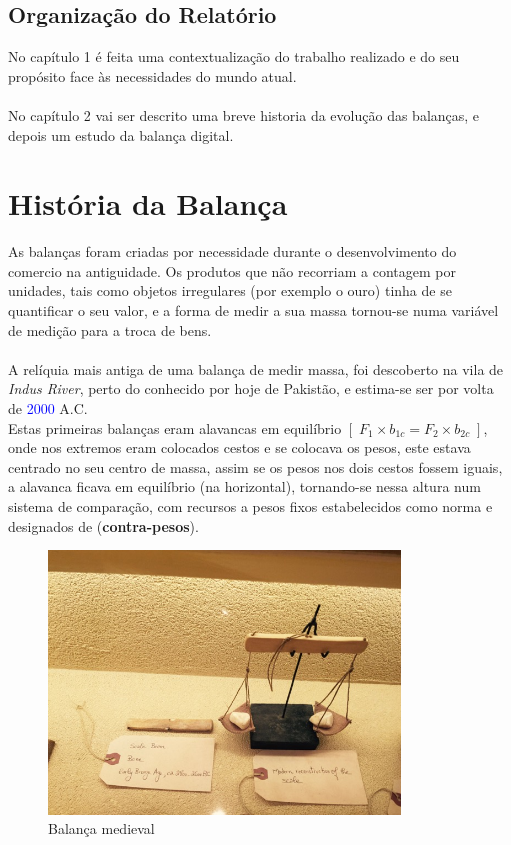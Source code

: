 \section{Organização do Relatório}
No capítulo 1 é feita uma contextualização do trabalho realizado e do seu propósito face às necessidades do mundo atual.\\
\\
No capítulo 2 vai ser descrito uma breve historia da evolução das balanças, e depois um estudo da balança digital.
\chapter{História da Balança}
As balanças foram criadas por necessidade durante o desenvolvimento do comercio na antiguidade. Os produtos que não recorriam a contagem por unidades, tais como objetos irregulares (por exemplo o ouro) tinha de se quantificar o seu valor, e a forma de medir a sua massa tornou-se numa variável de medição para a troca de bens.
\\
\\
A relíquia mais antiga de uma balança de medir massa, foi descoberto na vila de \textit{Indus River}, perto do conhecido por hoje de Pakistão, e estima-se ser por volta de \textcolor{blue}{2000} A.C.
\\
Estas primeiras balanças eram alavancas em equilíbrio $[ \; F_{1} \times b_{1c} = F_{2} \times b_{2c} \; ]$, onde nos extremos eram colocados cestos e se colocava os pesos, este estava centrado no seu centro de massa, assim se os pesos nos dois cestos fossem iguais, a alavanca ficava em equilíbrio (na horizontal), tornando-se nessa altura num sistema de comparação, com recursos a pesos fixos estabelecidos como norma e designados de (\textbf{contra-pesos}).
\\
\begin{minipage}[!b]{0.45\linewidth}
	\begin{figure}[H]
		\centering
		\includegraphics[height=7cm]{./image/PESTA/general/balanca_1.jpg}
		\caption{Balança medieval}
		\label{balanca_1}
	\end{figure}
\end{minipage}
